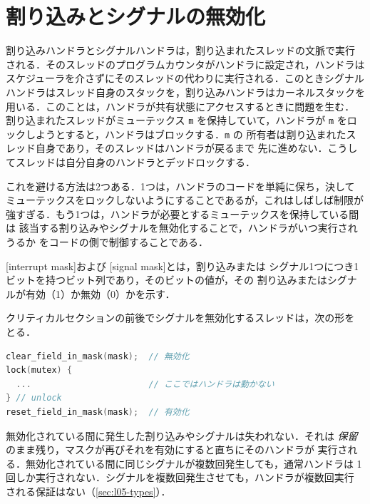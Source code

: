 \documentclass[../main.tex]{subfiles}
\begin{document}
\section{割り込みとシグナルの無効化}
\label{sec:l05-masks}

割り込みハンドラとシグナルハンドラは，割り込まれたスレッドの文脈で実行
される．そのスレッドのプログラムカウンタがハンドラに設定され，ハンドラは
スケジューラを介さずにそのスレッドの代わりに実行される．このときシグナル
ハンドラはスレッド自身のスタックを，割り込みハンドラはカーネルスタックを
用いる．このことは，ハンドラが共有状態にアクセスするときに問題を生む．
割り込まれたスレッドがミューテックス \texttt{m} を保持していて，ハンドラが
\texttt{m} をロックしようとすると，ハンドラはブロックする．\texttt{m} の
所有者は割り込まれたスレッド自身であり，そのスレッドはハンドラが戻るまで
先に進めない．こうしてスレッドは自分自身のハンドラとデッドロックする．

これを避ける方法は2つある．1つは，ハンドラのコードを単純に保ち，決して
ミューテックスをロックしないようにすることであるが，これはしばしば制限が
強すぎる．もう1つは，ハンドラが必要とするミューテックスを保持している間は
該当する割り込みやシグナルを無効化することで，ハンドラがいつ実行されうるか
をコードの側で制御することである．

\begin{definition}[割り込みマスクとシグナルマスク]
  [interrupt mask]および
  [signal mask]とは，割り込みまたは
  シグナル1つにつき1ビットを持つビット列であり，そのビットの値が，その
  割り込みまたはシグナルが有効（1）か無効（0）かを示す．
\end{definition}

クリティカルセクションの前後でシグナルを無効化するスレッドは，次の形を
とる．
\begin{lstlisting}[language=C, numbers=none]
clear_field_in_mask(mask);  // 無効化
lock(mutex) {
  ...                       // ここではハンドラは動かない
} // unlock
reset_field_in_mask(mask);  // 有効化
\end{lstlisting}
無効化されている間に発生した割り込みやシグナルは失われない．それは
\emph{保留}のまま残り，マスクが再びそれを有効にすると直ちにそのハンドラが
実行される．無効化されている間に同じシグナルが複数回発生しても，通常ハンドラは
1回しか実行されない．シグナルを複数回発生させても，ハンドラが複数回実行
される保証はない（\cref{sec:l05-types}）．
\end{document}
